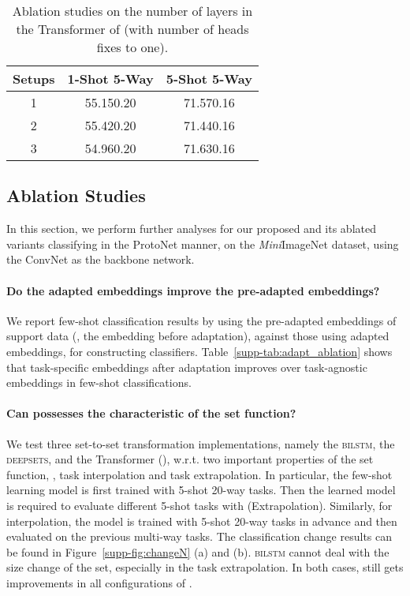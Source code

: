 \begin{table}[tbp]
	\small
	\tabcolsep 5pt
	\centering
	\caption{Ablation studies on the number of layers in the Transformer of {\feat} (with number of heads fixes to one).}
	\begin{tabular}{@{\;}ccc@{\;}}
		\addlinespace
		\toprule
		Setups  & 1-Shot 5-Way & 5-Shot 5-Way \\
		\midrule
		1     & 55.15{\tiny  0.20} & 71.57{\tiny  0.16}  \\
		2     & 55.42{\tiny  0.20} & 71.44{\tiny  0.16} \\
		3     & 54.96{\tiny  0.20} & 71.63{\tiny  0.16} \\
		\bottomrule
	\end{tabular}
	\label{supp-tab:component_layer}
\end{table}

\subsection{Ablation Studies}
\label{sec:supp-ablation}
In this section, we perform further analyses for our proposed {\feat} and its ablated variants classifying in the {ProtoNet} manner, on the {\it Mini}ImageNet dataset, using the ConvNet as the backbone network. 

\paragraph{Do the adapted embeddings improve the pre-adapted embeddings?} We report few-shot classification results by using the pre-adapted embeddings of support data (\ie, the embedding before adaptation), against those using adapted embeddings, for constructing classifiers. Table~\ref{supp-tab:adapt_ablation} shows that task-specific embeddings after adaptation improves over task-agnostic embeddings in few-shot classifications.


\paragraph{Can \feat possesses the characteristic of the set function?} We test three set-to-set transformation implementations, namely the \textsc{bilstm}, the \textsc{deepsets}, and the Transformer (\feat), w.r.t. two important properties of the set function, \ie, task interpolation and task extrapolation. In particular, the few-shot learning model is first trained with 5-shot 20-way tasks. Then the learned model is required to evaluate different 5-shot tasks with  (Extrapolation). Similarly, for interpolation, the model is trained with 5-shot 20-way tasks in advance and then evaluated on the previous multi-way tasks. The classification change results can be found in Figure~\ref{supp-fig:changeN} (a) and (b). \textsc{bilstm} cannot deal with the size change of the set, especially in the task extrapolation. In both cases, {\feat} still gets improvements in all configurations of . 



